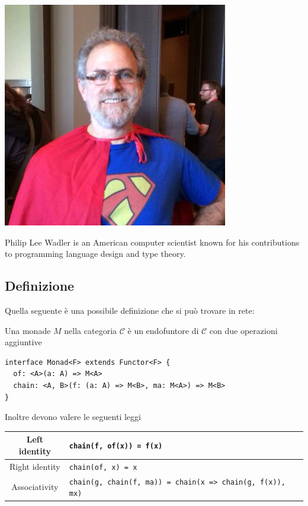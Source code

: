 \documentclass[12pt]{article}
\begin{document}
\begin{center}
\includegraphics[scale=0.45]{wadler}
\end{center}

Philip Lee Wadler is an American computer scientist known for his contributions to programming language design and type theory.

\subsection{Definizione}

Quella seguente è una possibile definizione che si può trovare in rete:

Una monade $M$ nella categoria $\mathcal{C}$ è un endofuntore di $\mathcal{C}$ con due operazioni aggiuntive

\begin{verbatim}
interface Monad<F> extends Functor<F> {
  of: <A>(a: A) => M<A>
  chain: <A, B>(f: (a: A) => M<B>, ma: M<A>) => M<B>
}
\end{verbatim}

Inoltre devono valere le seguenti leggi

\begin{center}
\bgroup
\def\arraystretch{1.5}
\begin{tabular}{ |c|p{10cm}| }
\hline
Left identity & \texttt{chain(f, of(x)) = f(x)} \\
\hline
Right identity & \texttt{chain(of, x) = x} \\
\hline
Associativity & \texttt{chain(g, chain(f, ma)) = chain(x => chain(g, f(x)), mx)} \\
\hline
\end{tabular}
\egroup
\end{center}
\end{document}
